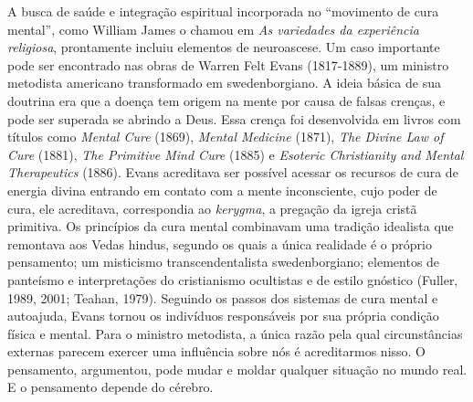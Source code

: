 A busca de saúde e integração espiritual incorporada no ``movimento de
cura mental'', como William James o chamou em \emph{As variedades da
experiência religiosa}, prontamente incluiu elementos de neuroascese. Um
caso importante pode ser encontrado nas obras de Warren Felt Evans
(1817-1889), um ministro metodista americano transformado em
swedenborgiano. A ideia básica de sua doutrina era que a doença tem
origem na mente por causa de falsas crenças, e pode ser superada se
abrindo a Deus. Essa crença foi desenvolvida em livros com títulos como
\emph{Mental Cure} (1869), \emph{Mental Medicine} (1871), \emph{The
Divine Law of Cure} (1881), \emph{The Primitive Mind Cure} (1885) e
\emph{Esoteric Christianity and} \emph{Mental Therapeutics} (1886).
Evans acreditava ser possível acessar os recursos de cura de energia
divina entrando em contato com a mente inconsciente, cujo poder de cura,
ele acreditava, correspondia ao \emph{kerygma}, a pregação da igreja
cristã primitiva. Os princípios da cura mental combinavam uma tradição
idealista que remontava aos Vedas hindus, segundo os quais a única
realidade é o próprio pensamento; um misticismo transcendentalista
swedenborgiano; elementos de panteísmo e interpretações do cristianismo
ocultistas e de estilo gnóstico (Fuller, 1989, 2001; Teahan, 1979).
Seguindo os passos dos sistemas de cura mental e autoajuda, Evans tornou
os indivíduos responsáveis por sua própria condição física e mental.
Para o ministro metodista, a única razão pela qual circunstâncias
externas parecem exercer uma influência sobre nós é acreditarmos nisso.
O pensamento, argumentou, pode mudar e moldar qualquer situação no mundo
real. E o pensamento depende do cérebro.

